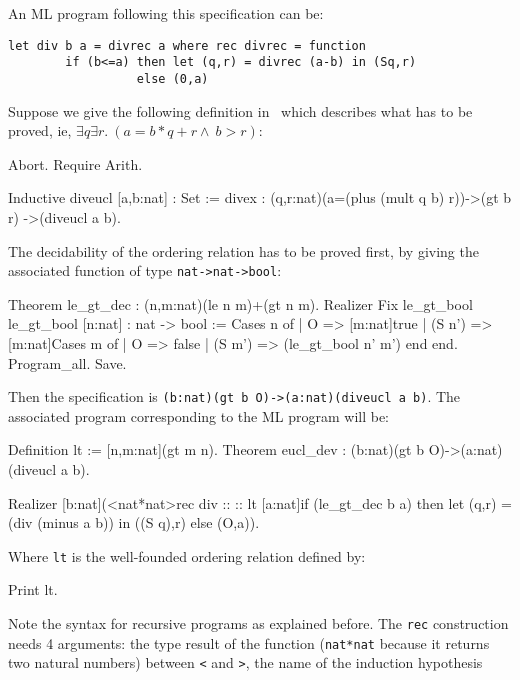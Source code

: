An ML program following this specification can be:
\begin{verbatim}
let div b a = divrec a where rec divrec = function
        if (b<=a) then let (q,r) = divrec (a-b) in (Sq,r)
                  else (0,a)
\end{verbatim}
Suppose we give the following definition in \Coq~which describes what
has to be proved, ie, $\exists q \exists r.~(a=b*q+r \wedge ~b>r)$:
\begin{coq_eval}
Abort.
Require Arith.
\end{coq_eval}
\begin{coq_example*}
Inductive diveucl [a,b:nat] : Set 
        := divex : (q,r:nat)(a=(plus (mult q b) r))->(gt b r)
                       ->(diveucl a b).
\end{coq_example*}
The decidability of the ordering relation has to be proved first, by
giving the associated function of type \verb!nat->nat->bool!:
\begin{coq_example*}
Theorem le_gt_dec : (n,m:nat){(le n m)}+{(gt n m)}.
Realizer Fix le_gt_bool {le_gt_bool [n:nat] : nat -> bool := 
             Cases n of 
             | O => [m:nat]true
             | (S n') => [m:nat]Cases m of
                         | O => false
                         | (S m') => (le_gt_bool n' m')
                         end
             end}.
Program_all.
Save.
\end{coq_example*}
Then the specification is \verb!(b:nat)(gt b O)->(a:nat)(diveucl a b)!.
The associated program corresponding to the ML program will be:
\begin{coq_eval}
Definition lt := [n,m:nat](gt m n).
Theorem eucl_dev : (b:nat)(gt b O)->(a:nat)(diveucl a b).
\end{coq_eval}
\begin{coq_example*}
Realizer 
      [b:nat](<nat*nat>rec div :: :: { lt }
              [a:nat]if (le_gt_dec b a) 
                        then let (q,r) = (div (minus a b))
                                      in ((S q),r)
                        else (O,a)).
\end{coq_example*}
Where \verb=lt= is the well-founded ordering relation defined by:
\begin{coq_example}
Print lt.
\end{coq_example}
Note the syntax for recursive programs as explained before. The
\verb=rec= construction needs 4 arguments: the type result of the
function (\verb=nat*nat= because it returns two natural numbers)
between \verb=<= and \verb=>=, the name of the induction hypothesis
